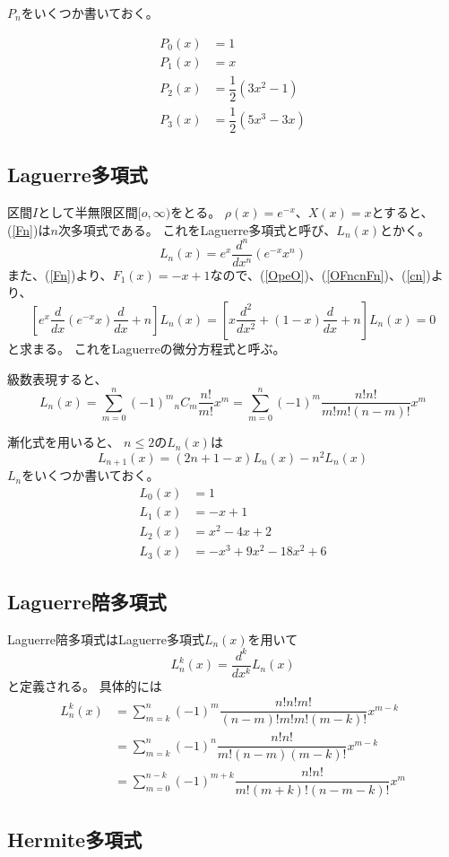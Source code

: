 $P_n$をいくつか書いておく。

\begin{align}
  P_0(x) &= 1 \\
  P_1(x) &= x \\
  P_2(x) &= \dfrac{1}{2}(3x^2 - 1) \\
  P_3(x) &= \dfrac{1}{2}(5x^3 - 3x)
\end{align}

\subsection{Laguerre多項式}
区間$I$として半無限区間$[o,\infty)$をとる。
  $\rho(x) = e^{-x}$、$X(x) = x$とすると、(\ref{Fn})は$n$次多項式である。
  これをLaguerre多項式と呼び、$L_n(x)$とかく。
  \begin{equation}
    \label{laguerre_polynomials}
    L_n(x) = e^x\dfrac{d^n}{dx^n}(e^{-x}x^n)
  \end{equation}
  また、(\ref{Fn})より、$F_1(x) = -x+1$なので、(\ref{OpeO})、(\ref{OFncnFn})、(\ref{cn})より、
  \begin{equation}
    \label{laguerre_DE}
    \left[ e^x\dfrac{d}{dx}(e^{-x}x)\dfrac{d}{dx} + n\right]L_n(x) = \left[ x\dfrac{d^2}{dx^2} + (1-x)\dfrac{d}{dx} + n\right]L_n(x) = 0
  \end{equation}
  と求まる。
  これをLaguerreの微分方程式と呼ぶ。

  級数表現すると、
  \begin{equation}
    L_n(x) = \sum_{m = 0}^n (-1)^m {}_nC_m\dfrac{n!}{m!}x^m = \sum_{m = 0}^n (-1)^m\dfrac{n!n!}{m!m!(n-m)!}x^m
  \end{equation}

  漸化式を用いると、
  $n \leq 2$の$L_n(x)$は
  \begin{equation}
    L_{n+1}(x) = (2n + 1 -x)L_n(x) - n^2L_n(x)
  \end{equation}
  $L_n$をいくつか書いておく。
  \begin{align}
    L_0(x) &= 1 \\
    L_1(x) &= -x + 1 \\
    L_2(x) &= x^2 -4x + 2 \\
    L_3(x) &= -x^3 + 9x^2 -18x^2 + 6
  \end{align}

  \subsection{Laguerre陪多項式}
  Laguerre陪多項式はLaguerre多項式$L_n(x)$を用いて
  \begin{equation}
    L_n^k(x) = \dfrac{d^k}{dx^k}L_n(x)
  \end{equation}
  と定義される。
  具体的には
  \begin{align}
    L_n^k(x) &= \sum_{m=k}^{n}(-1)^m \dfrac{n!n!m!}{(n-m)!m!m!(m-k)!}x^{m-k} \\
    &= \sum_{m=k}^{n}(-1)^n \dfrac{n!n!}{m!(n-m)(m-k)!}x^{m-k} \\
    &= \sum_{m=0}^{n-k}(-1)^{m+k} \dfrac{n!n!}{m!(m+k)!(n-m-k)!}x^{m}
  \end{align}




  \subsection{Hermite多項式}
